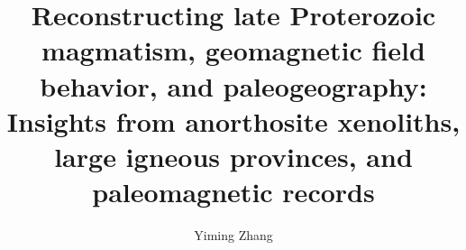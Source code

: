 \documentclass{ucbthesis}
\begin{document}

\title{Reconstructing late Proterozoic magmatism, geomagnetic field behavior, and paleogeography: Insights from anorthosite xenoliths, large igneous provinces, and paleomagnetic records}
\author{Yiming Zhang}



\maketitle
\approvalpage
\copyrightpage


\end{document}
